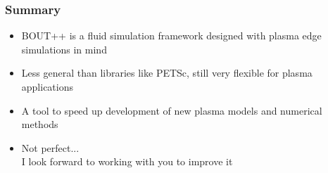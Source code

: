 \documentclass{beamer}
\begin{document}
\begin{frame}
  \frametitle{Summary}
  
  \begin{itemize}
  \item BOUT++ is a fluid simulation framework designed with plasma edge
    simulations in mind
  \item Less general than libraries like PETSc, still very flexible for plasma
    applications
  \item A tool to speed up development of new plasma models and numerical methods
    \pause
    \vspace{1cm}
  \item Not perfect... \\
    I look forward to working with you to improve it
  \end{itemize}
 
\end{frame}
\end{document}
